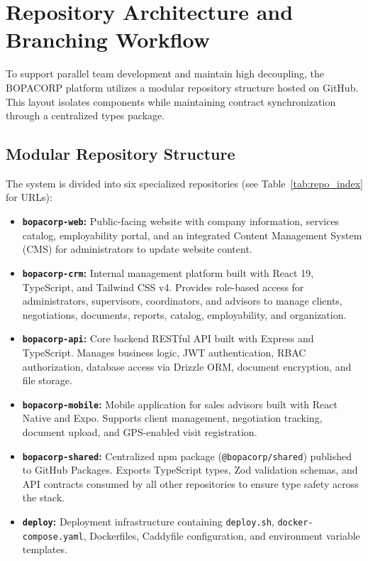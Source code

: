 \documentclass[letterpaper%
, oneside%
, 12pt%
, memoireprojet%
, english%
,creativecommons,hyperref, withAlgo2e %
]{thETS}
\begin{document}
\section{Repository Architecture and Branching Workflow}
To support parallel team development and maintain high decoupling, the BOPACORP platform utilizes a modular repository structure hosted on GitHub. This layout isolates components while maintaining contract synchronization through a centralized types package.

\subsection{Modular Repository Structure}
The system is divided into six specialized repositories (see Table~\ref{tab:repo_index} for URLs):
\begin{itemize}
    \item \textbf{\texttt{bopacorp-web}:} Public-facing website with company information, services catalog, employability portal, and an integrated Content Management System (CMS) for administrators to update website content.
    \item \textbf{\texttt{bopacorp-crm}:} Internal management platform built with React 19, TypeScript, and Tailwind CSS v4. Provides role-based access for administrators, supervisors, coordinators, and advisors to manage clients, negotiations, documents, reports, catalog, employability, and organization.
    \item \textbf{\texttt{bopacorp-api}:} Core backend RESTful API built with Express and TypeScript. Manages business logic, JWT authentication, RBAC authorization, database access via Drizzle ORM, document encryption, and file storage.
    \item \textbf{\texttt{bopacorp-mobile}:} Mobile application for sales advisors built with React Native and Expo. Supports client management, negotiation tracking, document upload, and GPS-enabled visit registration.
    \item \textbf{\texttt{bopacorp-shared}:} Centralized npm package (\texttt{@bopacorp/shared}) published to GitHub Packages. Exports TypeScript types, Zod validation schemas, and API contracts consumed by all other repositories to ensure type safety across the stack.
    \item \textbf{\texttt{deploy}:} Deployment infrastructure containing \texttt{deploy.sh}, \texttt{docker-compose.yaml}, Dockerfiles, Caddyfile configuration, and environment variable templates.
\end{itemize}
\end{document}
